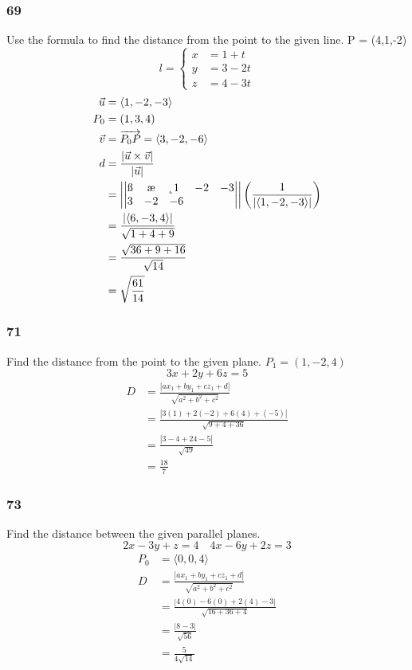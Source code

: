 \documentclass{math}
\begin{document}
\subsubsection*{69}
Use the formula to find the distance from the point to the given line.
P = (4,1,-2)
\[ l = \begin{cases}
  x &= 1+t \\
  y &= 3-2t \\
  z &= 4-3t
\end{cases} \]
\begin{align*}
  \vec{u} &= \langle1,-2,-3\rangle \\
  P_0 &= (1,3,4) \\
  \vec{v} &= \overrightarrow{P_0P} = \langle3,-2,-6\rangle \\
  d &= \frac{|\vec{u}\times\vec{v}|}{|\vec{u}|} \\
  &= \left|\begin{vmatrix}
    \i & \j & \k \\
    1 & -2 & -3 \\
    3 & -2 & -6
  \end{vmatrix}\right|\left(\frac{1}{|\langle1,-2,-3\rangle|}\right) \\
  &= \frac{|\langle6,-3,4\rangle|}{\sqrt{1+4+9}} \\
  &= \frac{\sqrt{36+9+16}}{\sqrt{14}} \\
  &= \sqrt{\frac{61}{14}}
\end{align*}

\subsubsection*{71}
Find the distance from the point to the given plane. \( P_1 = (1,-2,4) \)
\[ 3x+2y+6z = 5 \]
\begin{align*}
  D &= \frac{|ax_1+by_1+cz_1+d|}{\sqrt{a^2+b^2+c^2}} \\
  &= \frac{|3(1)+2(-2)+6(4)+(-5)|}{\sqrt{9+4+36}} \\
  &= \frac{|3-4+24-5|}{\sqrt{49}} \\
  &= \frac{18}{7}
\end{align*}

\subsubsection*{73}
Find the distance between the given parallel planes.
\[ 2x-3y+z = 4 \quad 4x-6y+2z = 3 \]
\begin{align*}
  P_0 &= \langle0,0,4\rangle \\
  D &= \frac{|ax_1+by_1+cz_1+d|}{\sqrt{a^2+b^2+c^2}} \\
  &= \frac{|4(0)-6(0)+2(4)-3|}{\sqrt{16+36+4}} \\
  &= \frac{|8-3|}{\sqrt{56}} \\
  &= \frac{5}{4\sqrt{14}}
\end{align*}
\end{document}
